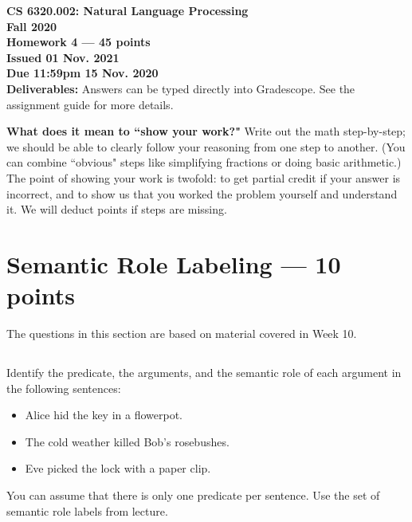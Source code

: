 \documentclass[12pt,a4paper]{article}
\begin{document}
\pagestyle{empty}

\textbf{CS 6320.002: Natural Language Processing} \\
\textbf{Fall 2020} \\

\textbf{Homework 4 --- 45 points} \\
\textbf{Issued 01 Nov. 2021} \\
\textbf{Due 11:59pm 15 Nov. 2020} \\

\textbf{Deliverables:} Answers can be typed directly into Gradescope. See the assignment guide for more details.

\vspace{\baselineskip}

\textbf{What does it mean to ``show your work?"} Write out the math step-by-step; we should be able to clearly follow your reasoning from one step to another. (You can combine ``obvious" steps like simplifying fractions or doing basic arithmetic.) The point of showing your work is twofold: to get partial credit if your answer is incorrect, and to show us that you worked the problem yourself and understand it. We will deduct points if steps are missing.

\section{Semantic Role Labeling --- 10 points}

The questions in this section are based on material covered in Week 10.

\subsection{}

Identify the predicate, the arguments, and the semantic role of each argument in the following sentences:

\begin{itemize}
\item Alice hid the key in a flowerpot.
\item The cold weather killed Bob's rosebushes.
\item Eve picked the lock with a paper clip.
\end{itemize}

You can assume that there is only one predicate per sentence. Use the set of semantic role labels from lecture.

\subsection{}
\end{document}
